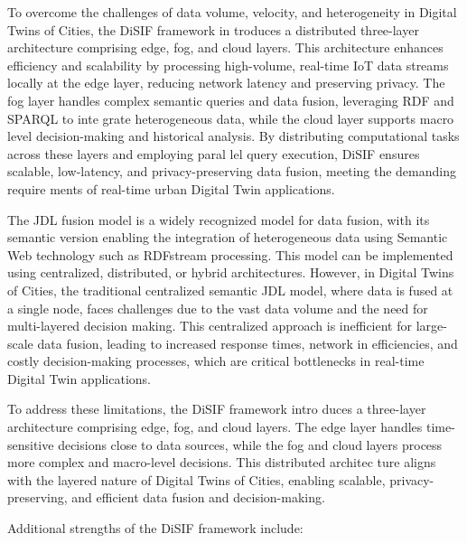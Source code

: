 \documentclass[5p,times]{elsarticle}
\begin{document}
   To overcome the challenges of data volume, velocity, and
   heterogeneity in Digital Twins of Cities, the DiSIF framework in
  troduces a distributed three-layer architecture comprising edge,
   fog, and cloud layers. This architecture enhances efficiency
   and scalability by processing high-volume, real-time IoT data
   streams locally at the edge layer, reducing network latency and
   preserving privacy. The fog layer handles complex semantic
   queries and data fusion, leveraging RDF and SPARQL to inte
  grate heterogeneous data, while the cloud layer supports macro
  level decision-making and historical analysis. By distributing
   computational tasks across these layers and employing paral
  lel query execution, DiSIF ensures scalable, low-latency, and
   privacy-preserving data fusion, meeting the demanding require
  ments of real-time urban Digital Twin applications.


  The JDL fusion model is a widely recognized model for data
  fusion, with its semantic version \cite{noughabi2013semfus} enabling the integration
  of heterogeneous data using Semantic Web technology such as
  RDFstream processing. This model can be implemented using
  centralized, distributed, or hybrid architectures. However, in
  Digital Twins of Cities, the traditional centralized semantic JDL
  model, where data is fused at a single node, faces challenges due
  to the vast data volume and the need for multi-layered decision
 making. This centralized approach is inefficient for large-scale
  data fusion, leading to increased response times, network in
 efficiencies, and costly decision-making processes, which are
  critical bottlenecks in real-time Digital Twin applications.

  To address these limitations, the DiSIF framework intro
  duces a three-layer architecture comprising edge, fog, and cloud
   layers. The edge layer handles time-sensitive decisions close
   to data sources, while the fog and cloud layers process more
   complex and macro-level decisions. This distributed architec
  ture aligns with the layered nature of Digital Twins of Cities,
   enabling scalable, privacy-preserving, and efficient data fusion
   and decision-making.


   Additional strengths of the DiSIF framework include:
\end{document}
